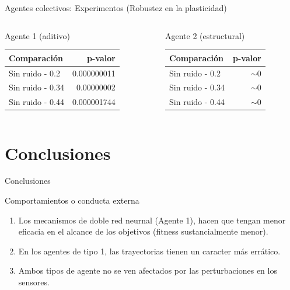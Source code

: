 \documentclass[aspectratio=169]{beamer}
\begin{document}
\begin{frame}{Agentes colectivos: Experimentos (Robustez en la plasticidad)}
  \begin{columns}
    \begin{column}{0.47\textwidth}
      \begin{block}{Agente 1 (aditivo)}
        \begin{table}
         \begin{tabular}{lr}
           \toprule
           Comparación & p-valor\\
           \midrule
           Sin ruido - 0.2 & 0.000000011\\
           Sin ruido - 0.34 & 0.00000002\\
           Sin ruido - 0.44 & 0.000001744\\
           \bottomrule
         \end{tabular}
       \end{table}
    \end{block}
    \end{column}
    \begin{column}{0.5\textwidth}
      \begin{block}{Agente 2 (estructural)}
        \begin{table}
         \begin{tabular}{lr}
           \toprule
           Comparación & p-valor\\
           \midrule
           Sin ruido - 0.2 & $\sim 0$\\
           Sin ruido - 0.34 & $\sim 0$\\
           Sin ruido - 0.44 & $\sim 0$\\
           \bottomrule
         \end{tabular}
       \end{table}
      \end{block}
    \end{column}
  \end{columns}
\end{frame}

\section{Conclusiones}
\begin{frame}{Conclusiones}
\begin{block}{Comportamientos o conducta externa}
  \begin{enumerate}
    \item Los mecanismos de doble red neurnal (Agente 1), hacen que tengan menor eficacia en el alcance de los objetivos (fitness sustancialmente menor).
    \item En los agentes de tipo 1, las trayectorias tienen un caracter más errático.
    \item Ambos tipos de agente no se ven afectados por las perturbaciones en los sensores.
  \end{enumerate}
\end{block}
\end{frame}
\end{document}
